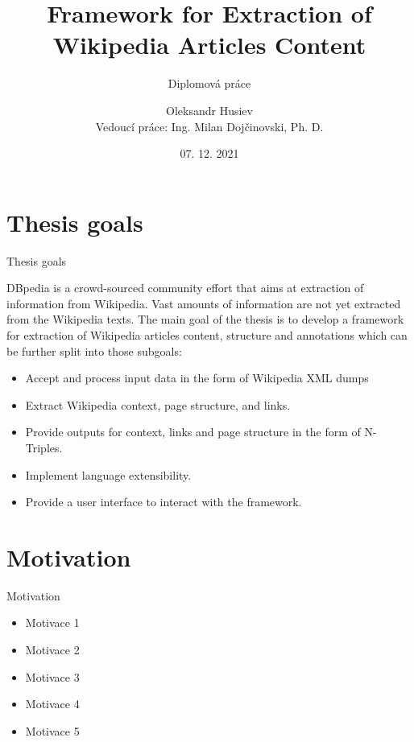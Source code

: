 \documentclass[czech,aspectratio=169]{beamer}
\title[Framework for Extraction of Wikipedia Articles Content]{Framework for Extraction of Wikipedia Articles Content}
\subtitle{Diplomová práce}
\institute[FIT ČVUT v Praze]{Fakulta informačních technologií \\ České vysoké učení technické v Praze}
\author[Oleksandr Husiev]{Oleksandr Husiev \\ Vedoucí práce: Ing. Milan Doj{\v c}inovski, Ph. D.}
\date{07. 12. 2021}
\begin{document}
    \begin{frame}
        \titlepage
    \end{frame}
    
    \begin{frame}
        \tableofcontents
    \end{frame}
  
    \section{Thesis goals}
    
    \begin{frame}{Thesis goals}
    	
    	DBpedia is a crowd-sourced community effort that aims at extraction of information from Wikipedia. Vast amounts of information are not yet extracted from the Wikipedia texts. The main goal of the thesis is to develop a framework for extraction of Wikipedia articles content, structure and annotations which can be further split into those subgoals:
    	
        \begin{itemize}
            \item Accept and process input data in the form of Wikipedia XML dumps
            \item Extract Wikipedia context, page structure, and links.
            \item Provide outputs for context, links and page structure in the form of N-Triples.
            \item Implement language extensibility.
            \item Provide a user interface to interact with the framework.
        \end{itemize}
    \end{frame}
    
    \section{Motivation}
    \begin{frame}{Motivation}
        \begin{itemize}
            \item Motivace 1
            \item Motivace 2
            \item Motivace 3
            \item Motivace 4
            \item Motivace 5
        \end{itemize}
    \end{frame}
  
\end{document}
